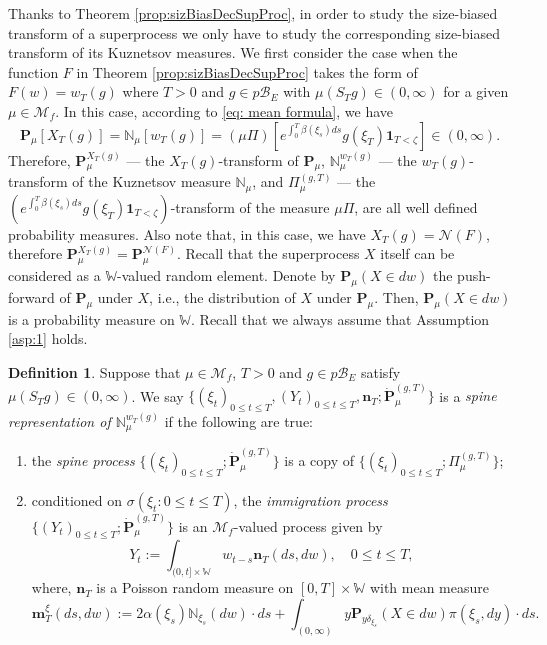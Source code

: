 \documentclass[UTF8]{pkuthss}
\theoremstyle{plain}
\theoremstyle{definition}
\newtheorem{defi}[thm]{Definition}
\numberwithin{equation}{section}
\begin{document}
	Thanks to Theorem \ref{prop:sizBiasDecSupProc}, in order to study the size-biased transform of a superprocess we only have to study the corresponding size-biased transform of its Kuznetsov measures. 	
	We first consider the case when the function $F$ in Theorem \ref{prop:sizBiasDecSupProc} takes the form of $F(w)=w_T(g)$ where $T>0$ and $g\in p\mathscr B_E$ with $\mu(S_Tg)\in (0,\infty)$ for a given $\mu \in \mathcal M_f$.
	In this case, according to \eqref{eq: mean formula}, we have
\[
	\mathbf P_\mu [X_T(g)]
	= \mathbb N_\mu[w_T(g)] 
	= (\mu\Pi)[e^{\int_0^T \beta(\xi_s)ds}g(\xi_T)\mathbf 1_{T < \zeta}]
	\in (0,\infty).
\]
	Therefore, $\mathbf P_\mu^{X_T(g)}$ --- the $X_T(g)$-transform of $\mathbf P_\mu$, $\mathbb N_\mu^{w_T(g)}$ --- the $w_T(g)$-transform of the Kuznetsov measure $\mathbb N_\mu$, 
	and $\Pi^{(g,T)}_\mu$ --- the $(e^{\int_0^T\beta(\xi_s)ds} g(\xi_T)\mathbf 1_{T< \zeta})$-transform of the measure $\mu\Pi$, 
	are all well defined probability measures.
	Also note that, in this case, we have $X_T(g) = \mathcal N(F)$, therefore $\mathbf P_\mu^{X_T(g)} = \mathbf P_\mu^{\mathcal N(F)}$.
Recall that the superprocess $X$ itself can be considered as a $\mathbb W$-valued random element.
	Denote by $\mathbf P_\mu(X \in dw)$ the push-forward of $\mathbf P_\mu$ under $X$, i.e., the distribution of $X$ under $\mathbf P_\mu$. Then, $\mathbf P_\mu(X \in dw)$ is a probability measure on $\mathbb W$.
	Recall that we always assume that Assumption \ref{asp:1} holds.
\begin{defi}
\label{def: Spine representation}
Suppose that $\mu \in \mathcal M_f$, $T >0$ and $g \in p\mathscr B_E$ satisfy $\mu(S_Tg)\in (0,\infty)$.
	We say $\{(\xi_t)_{0\leq t\leq T}, (Y_t)_{0\leq t\leq T}, \mathbf n_T; \dot {\mathbf P}^{(g,T)}_\mu\}$ is a \emph{spine representation of $\mathbb N_\mu^{w_T(g)}$} if the following are true:
\begin{enumerate}
\item \label{def: Spine representation 1}
	the \emph{spine process} $\{(\xi_t)_{0\leq t\leq T}; \dot{\mathbf P}^{(g,T)}_\mu\}$ is a copy of $\{(\xi_t)_{0\leq t\leq T}; \Pi^{(g,T)}_\mu\}$;
\item
	conditioned on $\sigma(\xi_t: 0 \leq t\leq T)$, the \emph{immigration process}
	$\{(Y_t)_{0\leq t\leq T}; \dot{\mathbf P}^{(g,T)}_\mu\}$ is an $\mathcal M_f$-valued process given by
\begin{equation}\label{eq:defSpinImmigr}
	Y_t
	:= \int_{(0,t] \times \mathbb W} w_{t-s} \mathbf n_T(ds,dw),
	\quad 0 \leq t\leq T,
\end{equation}
	where,
	$\mathbf n_T$
	is a Poisson random measure on $[0,T] \times \mathbb W$ with mean measure
\begin{equation}\label{eq:meanMeasImmigr}
	\mathbf m^\xi_T(ds,dw)
	:= 2 \alpha(\xi_s) \mathbb N_{\xi_s}(dw)\cdot ds +  \int_{(0,\infty)} y \mathbf P_{y\delta_{\xi_s}}(X\in dw) \pi(\xi_s,dy)\cdot ds.
\end{equation}
\end{enumerate}
\end{defi}
\end{document}
